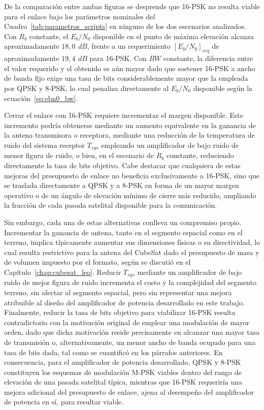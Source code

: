 De la comparación entre ambas figuras se desprende que 16-PSK no resulta viable para el enlace bajo los parámetros nominales del Cuadro~\ref{tab:parametros_scripts} en ninguno de los dos escenarios analizados. Con $R_b$ constante, el $E_b/N_0$ disponible en el punto de máxima elevación alcanza aproximadamente $18,0~\,dB$, frente a un requerimiento $[E_b/N_0]_{req}$ de aproximadamente $19,4~\,dB$ para 16-PSK. Con $BW$ constante, la diferencia entre el valor requerido y el obtenido es aún mayor dado que sostener 16-PSK a ancho de banda fijo exige una tasa de bits considerablemente mayor que la empleada por QPSK y 8-PSK, lo cual penaliza directamente al $E_b/N_0$ disponible según la ecuación~\eqref{eq:ebn0_bw}.

Cerrar el enlace con 16-PSK requiere incrementar el margen disponible. Este incremento podría obtenerse mediante un aumento equivalente en la ganancia de la antena transmisora o receptora, mediante una reducción de la temperatura de ruido del sistema receptor $T_{sys}$ empleando un amplificador de bajo ruido de menor figura de ruido, o bien, en el escenario de $R_b$ constante, reduciendo directamente la tasa de bits objetivo. Cabe destacar que cualquiera de estas mejoras del presupuesto de enlace no beneficia exclusivamente a 16-PSK, sino que se traslada directamente a QPSK y a 8-PSK en forma de un mayor margen operativo o de un ángulo de elevación mínimo de cierre más reducido, ampliando la fracción de cada pasada satelital disponible para la comunicación.

Sin embargo, cada una de estas alternativas conlleva un compromiso propio. Incrementar la ganancia de antena, tanto en el segmento espacial como en el terreno, implica típicamente aumentar sus dimensiones físicas o su directividad, lo cual resulta restrictivo para la antena del CubeSat dado el presupuesto de masa y de volumen impuesto por el formato, según se discutió en el Capítulo~\ref{chap:cubesat_leo}. Reducir $T_{sys}$ mediante un amplificador de bajo ruido de mejor figura de ruido incrementa el costo y la complejidad del segmento terreno, sin afectar al segmento espacial, pero sin representar una mejora atribuible al diseño del amplificador de potencia desarrollado en este trabajo. Finalmente, reducir la tasa de bits objetivo para viabilizar 16-PSK resulta contradictorio con la motivación original de emplear una modulación de mayor orden, dado que dicha motivación reside precisamente en alcanzar una mayor tasa de transmisión o, alternativamente, un menor ancho de banda ocupado para una tasa de bits dada, tal como se cuantificó en los párrafos anteriores. En consecuencia, para el amplificador de potencia desarrollado, QPSK y 8-PSK constituyen los esquemas de modulación M-PSK viables dentro del rango de elevación de una pasada satelital típica, mientras que 16-PSK requeriría una mejora adicional del presupuesto de enlace, ajena al desempeño del amplificador de potencia en sí, para resultar viable.